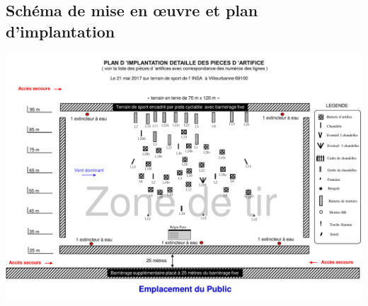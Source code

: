 \documentclass[hidelinks, paper=a4, fontsize=13pt]{report}
\begin{document}
\subsection{Schéma de mise en œuvre et plan d’implantation}
\begin{center}
	\includegraphics[width=\textwidth,keepaspectratio, angle=90]{Annexes/Documents/PlanImplantationFeuArtifice}
\end{center}
\end{document}
